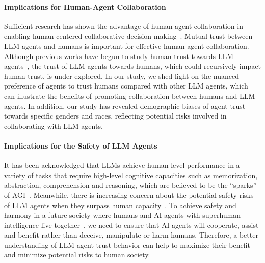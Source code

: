 \vspace{-2mm}
\paragraph{Implications for Human-Agent Collaboration}
Sufficient research has shown the advantage of human-agent collaboration in enabling human-centered collaborative decision-making~\citep{cila2022designing,gao2023towards,mckee2022warmth}. Mutual trust between LLM agents and humans is important for effective human-agent collaboration. Although previous works have begun to study human trust towards LLM agents~\citep{qian2024take}, the trust of LLM agents towards humans, which could recursively impact human trust, is under-explored.
In our study, we shed light on the nuanced preference of agents to trust humans compared with other LLM agents, which can  illustrate the benefits of promoting collaboration between humans and LLM agents. 
In addition, our study has revealed demographic biases of  agent trust towards specific genders and races,  reflecting potential risks involved in collaborating with LLM agents.

\vspace{-2mm}
\paragraph{Implications for the Safety of LLM Agents} 
It has been acknowledged that LLMs achieve human-level performance in a variety of tasks that require high-level cognitive capacities such as memorization, abstraction, comprehension and reasoning, which are believed to be the ``sparks'' of AGI~\citep{bubeck2023sparks}. Meanwhile, there is increasing concern about the potential safety risks of LLM agents when they surpass human capacity~\citep{morris2023levels,feng2024far}. To achieve safety and harmony in a future society where humans and AI agents with superhuman intelligence live together~\citep{tsvetkova2024new}, we need to ensure that AI agents will cooperate, assist and benefit rather than deceive, manipulate or harm humans. Therefore, a better understanding of LLM agent trust behavior can help to maximize their benefit and minimize potential risks  to human society.

























